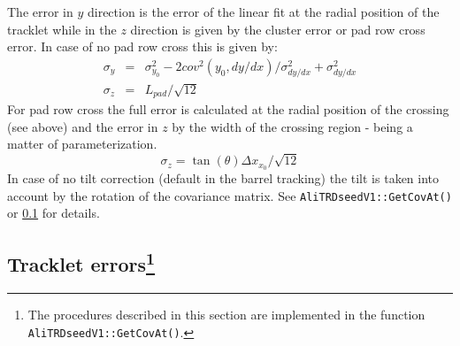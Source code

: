 \documentclass{alicetdr}
\begin{document}
The error in $y$ direction is the error of the linear fit at the radial
position of the tracklet while in the $z$ direction is given by the cluster
error or pad row cross error. In case of no pad row cross this is given by:
\begin{eqnarray}
\sigma_{y} &=& \sigma^{2}_{y_{0}} - 2cov^{2}(y_{0}, dy/dx)/\sigma^{2}_{dy/dx}
            + \sigma^{2}_{dy/dx}\\
\sigma_{z} &=& L_{pad}/\sqrt{12}
\end{eqnarray}
For pad row cross the full error is calculated at the radial position of the
crossing (see above) and the error in $z$ by the width of the crossing region -
being a matter of parameterization.
\begin{equation}
\sigma_{z} = \tan(\theta) \Delta x_{x_{0}}/\sqrt{12}
\end{equation}
In case of no tilt correction (default in the barrel tracking) the tilt is
taken into account by the rotation of the covariance matrix. See
{\tt AliTRDseedV1::GetCovAt()} or \ref{REC:Tracking:TrackletErrors} for details.

\subsection[Tracklet errors]{Tracklet errors\footnote{The procedures described in this
section are implemented in the function
{\tt AliTRDseedV1::GetCovAt()}.}}\label{REC:Tracking:TrackletErrors}
\end{document}
